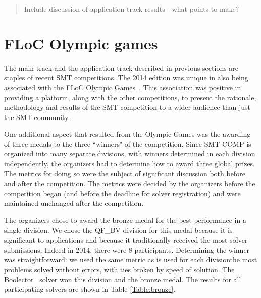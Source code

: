 \documentclass[twoside,11pt]{article}
\newcommand{\comment}[2]{\begin{quote}\sc #1\marginpar{\textcolor{red}{$\ast^{\mbox{#2}}$}}\end{quote}}
\newcommand{\davidc}[1]{\comment{#1}{DC}}
\begin{document}
\davidc{Include discussion of application track results - what points to make?}




\section{FLoC Olympic games}
\label{sec:floc}

The main track and the application track described in previous sections are staples of recent SMT competitions. The 2014 edition was unique in also being associated with the FLoC Olympic Games~\cite{FLoCGames}.
This association was positive in providing a platform, along with the other competitions, to present the
rationale, methodology and results of the SMT competition to a wider audience than just the SMT community.

One additional aspect that resulted from the Olympic Games was the awarding of three medals to the three ``winners" of the competition. Since SMT-COMP is organized into many separate divisions, with winners determined in each division independently, the organizers had to determine how to award three global prizes.
The metrics for doing so were the subject of significant discussion both before and after the competition.
The metrics were decided by the organizers before the competition began (and before the deadline for solver registration) and were maintained unchanged after the competition.

The organizers chose to award the bronze medal for the best performance in a single division. We chose  the QF\_BV division for this medal because it is significant to applications and because it traditionally received the most solver submissions. Indeed in 2014, there were 8 participants. Determining the winner was straightforward: we used the same metric as is used for each division\textemdash the most problems solved without errors, with ties broken by speed of solution. The Boolector~\cite{boolector} solver won this division and the bronze medal. The results for all participating solvers are shown in Table \ref{Table:bronze}.
\end{document}
